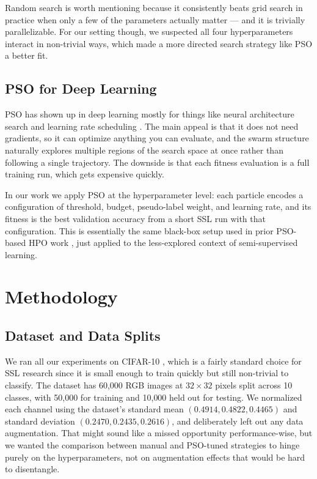 \documentclass[journal]{IEEEtran}
\begin{document}
Random search \cite{bergstra2012random} is worth mentioning because it
consistently beats grid search in practice when only a few of the parameters
actually matter --- and it is trivially parallelizable. For our setting though,
we suspected all four hyperparameters interact in non-trivial ways, which made
a more directed search strategy like PSO a better fit.

\subsection{PSO for Deep Learning}

PSO has shown up in deep learning mostly for things like neural architecture
search and learning rate scheduling \cite{lorenzo2017psonn}. The main appeal
is that it does not need gradients, so it can optimize anything you can
evaluate, and the swarm structure naturally explores multiple regions of the
search space at once rather than following a single trajectory. The downside is
that each fitness evaluation is a full training run, which gets expensive
quickly.

In our work we apply PSO at the hyperparameter level: each particle encodes a
configuration of threshold, budget, pseudo-label weight, and learning rate,
and its fitness is the best validation accuracy from a short SSL run with that
configuration. This is essentially the same black-box setup used in prior
PSO-based HPO work \cite{lorenzo2017psonn}, just applied to the less-explored
context of semi-supervised learning.

\section{Methodology}

\subsection{Dataset and Data Splits}

We ran all our experiments on CIFAR-10 \cite{krizhevsky2009cifar10}, which
is a fairly standard choice for SSL research since it is small enough to train
quickly but still non-trivial to classify. The dataset has 60,000 RGB images
at $32{\times}32$ pixels split across 10 classes, with 50,000 for training and
10,000 held out for testing. We normalized each channel using the dataset's
standard mean $(0.4914, 0.4822, 0.4465)$ and standard deviation $(0.2470,
0.2435, 0.2616)$, and deliberately left out any data augmentation. That might
sound like a missed opportunity performance-wise, but we wanted the comparison
between manual and PSO-tuned strategies to hinge purely on the
hyperparameters, not on augmentation effects that would be hard to
disentangle.
\end{document}
